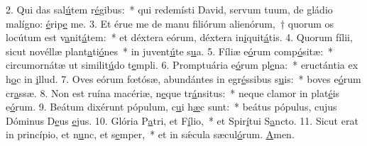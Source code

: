 2. Qui das sal\uline{ú}tem r\uline{é}gibus:~* qui redemísti David, servum tuum, de gládio malígno: \uline{é}rip\uline{e} me.
3. Et érue me de manu filiórum alienórum,~† quorum os locútum est v\uline{a}nit\uline{á}tem:~* et déxtera eórum, déxtera in\uline{i}quit\uline{á}tis.
4. Quorum fílii, sicut novéllæ plant\uline{a}ti\uline{ó}nes~* in juvent\uline{ú}te s\uline{u}a.
5. Fíliæ e\uline{ó}rum comp\uline{ó}sitæ:~* circumornátæ ut similit\uline{ú}do t\uline{e}mpli.
6. Promptuária e\uline{ó}rum pl\uline{e}na:~* eructántia ex h\uline{o}c in \uline{i}llud.
7. Oves eórum fœtósæ, abundántes in egr\uline{é}ssibus s\uline{u}is:~* boves e\uline{ó}rum cr\uline{a}ssæ.
8. Non est ruína macériæ, n\uline{e}que tr\uline{á}nsitus:~* neque clamor in plat\uline{é}is e\uline{ó}rum.
9. Beátum dixérunt pópulum, c\uline{u}i h\uline{æ}c sunt:~* beátus pópulus, cujus Dóminus D\uline{e}us \uline{e}jus.
10. Glória P\uline{a}tri, et F\uline{í}lio,~* et Spir\uline{í}tui S\uline{a}ncto.
11. Sicut erat in princípio, et n\uline{u}nc, et s\uline{e}mper,~* et in sǽcula sæcul\uline{ó}rum. \uline{A}men.
